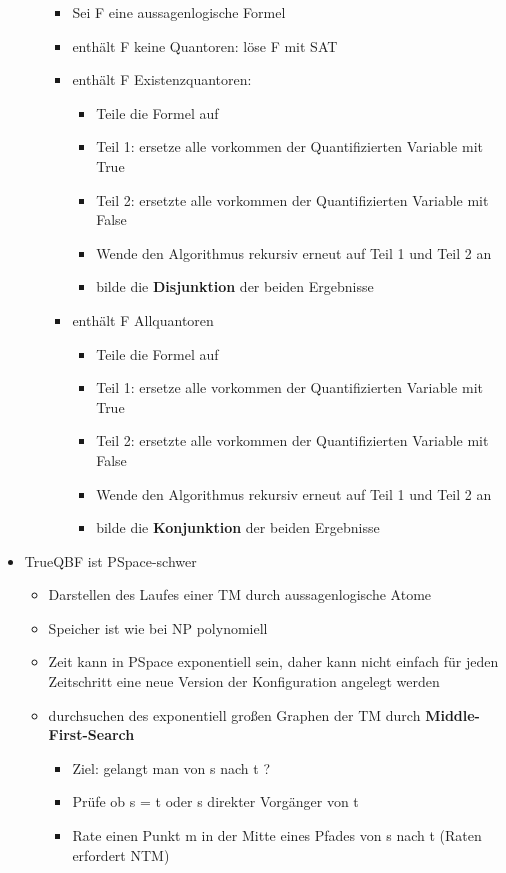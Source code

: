 \documentclass[12pt,a4paper]{article}
\begin{document}
\begin{itemize}
\begin{itemize}
\begin{itemize}
\item Sei F eine aussagenlogische Formel
\item enthält F keine Quantoren: löse F mit SAT
\item enthält F Existenzquantoren: 
\begin{itemize}
\item Teile die Formel auf
\item Teil 1: ersetze alle vorkommen der Quantifizierten Variable mit True
\item Teil 2: ersetzte alle vorkommen der Quantifizierten Variable mit False
\item Wende den Algorithmus rekursiv erneut auf Teil 1 und Teil 2 an
\item bilde die \textbf{Disjunktion} der beiden Ergebnisse
\end{itemize}
\item enthält F Allquantoren
\begin{itemize}
\item Teile die Formel auf
\item Teil 1: ersetze alle vorkommen der Quantifizierten Variable mit True
\item Teil 2: ersetzte alle vorkommen der Quantifizierten Variable mit False
\item Wende den Algorithmus rekursiv erneut auf Teil 1 und Teil 2 an
\item bilde die \textbf{Konjunktion} der beiden Ergebnisse
\end{itemize}
\end{itemize}
\end{itemize}
\item TrueQBF ist PSpace-schwer
\begin{itemize}
\item Darstellen des Laufes einer TM durch aussagenlogische Atome
\item Speicher ist wie bei NP polynomiell
\item Zeit kann in PSpace exponentiell sein, daher kann nicht einfach für jeden Zeitschritt eine neue Version der Konfiguration angelegt werden 
\item durchsuchen des exponentiell großen Graphen der TM durch \textbf{Middle-First-Search}
\begin{itemize}
\item Ziel: gelangt man von s nach t ?
\item Prüfe ob s = t oder s direkter Vorgänger von t
\item Rate einen Punkt m in der Mitte eines Pfades von s nach t (Raten erfordert NTM)

\end{itemize}
\end{itemize}
\end{itemize}
\end{document}
